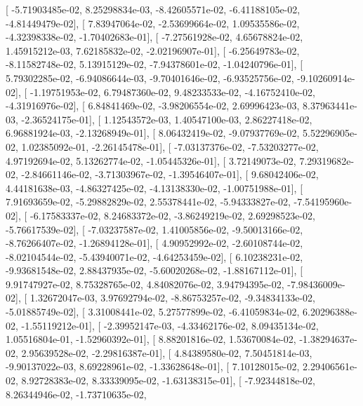 \documentclass{article}
\begin{document}
       [ -5.71903485e-02,   8.25298834e-03,  -8.42605571e-02,
         -6.41188105e-02,  -4.81449479e-02],
       [  7.83947064e-02,  -2.53699664e-02,   1.09535586e-02,
         -4.32398338e-02,  -1.70402683e-01],
       [ -7.27561928e-02,   4.65678824e-02,   1.45915212e-03,
          7.62185832e-02,  -2.02196907e-01],
       [ -6.25649783e-02,  -8.11582748e-02,   5.13915129e-02,
         -7.94378601e-02,  -1.04240796e-01],
       [  5.79302285e-02,  -6.94086644e-03,  -9.70401646e-02,
         -6.93525756e-02,  -9.10260914e-02],
       [ -1.19751953e-02,   6.79487360e-02,   9.48233533e-02,
         -4.16752410e-02,  -4.31916976e-02],
       [  6.84841469e-02,  -3.98206554e-02,   2.69996423e-03,
          8.37963441e-03,  -2.36524175e-01],
       [  1.12543572e-03,   1.40547100e-03,   2.86227418e-02,
          6.96881924e-03,  -2.13268949e-01],
       [  8.06432419e-02,  -9.07937769e-02,   5.52296905e-02,
          1.02385092e-01,  -2.26145478e-01],
       [ -7.03137376e-02,  -7.53203277e-02,   4.97192694e-02,
          5.13262774e-02,  -1.05445326e-01],
       [  3.72149073e-02,   7.29319682e-02,  -2.84661146e-02,
         -3.71303967e-02,  -1.39546407e-01],
       [  9.68042406e-02,   4.44181638e-03,  -4.86327425e-02,
         -4.13138330e-02,  -1.00751988e-01],
       [  7.91693659e-02,  -5.29882829e-02,   2.55378441e-02,
         -5.94333827e-02,  -7.54195960e-02],
       [ -6.17583337e-02,   8.24683372e-02,  -3.86249219e-02,
          2.69298523e-02,  -5.76617539e-02],
       [ -7.03237587e-02,   1.41005856e-02,  -9.50013166e-02,
         -8.76266407e-02,  -1.26894128e-01],
       [  4.90952992e-02,  -2.60108744e-02,  -8.02104544e-02,
         -5.43940071e-02,  -4.64253459e-02],
       [  6.10238231e-02,  -9.93681548e-02,   2.88437935e-02,
         -5.60020268e-02,  -1.88167112e-01],
       [  9.91747927e-02,   8.75328765e-02,   4.84082076e-02,
          3.94794395e-02,  -7.98436009e-02],
       [  1.32672047e-03,   3.97692794e-02,  -8.86753257e-02,
         -9.34834133e-02,  -5.01885749e-02],
       [  3.31008441e-02,   5.27577899e-02,  -6.41059834e-02,
          6.20296388e-02,  -1.55119212e-01],
       [ -2.39952147e-03,  -4.33462176e-02,   8.09435134e-02,
          1.05516804e-01,  -1.52960392e-01],
       [  8.88201816e-02,   1.53670084e-02,  -1.38294637e-02,
          2.95639528e-02,  -2.29816387e-01],
       [  4.84389580e-02,   7.50451814e-03,  -9.90137022e-03,
          8.69228961e-02,  -1.33628648e-01],
       [  7.10128015e-02,   2.29406561e-02,   8.92728383e-02,
          8.33339095e-02,  -1.63138315e-01],
       [ -7.92344818e-02,   8.26344946e-02,  -1.73710635e-02,
\end{document}
